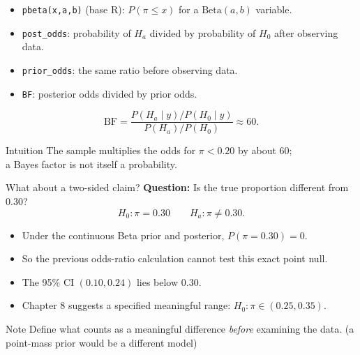 \documentclass[aspectratio=43]{beamer}
\begin{document}
\begin{frame}{}
\begin{itemize}
\item \texttt{pbeta(x,a,b)} (base R): $P(\pi\le x)$ for a $\mathrm{Beta}(a,b)$ variable.
\item \texttt{post\_odds}: probability of $H_a$ divided by probability of $H_0$ after observing data.
\item \texttt{prior\_odds}: the same ratio before observing data.
\item \texttt{BF}: posterior odds divided by prior odds.
\end{itemize}
\[
\mathrm{BF}=\frac{P(H_a\mid y)/P(H_0\mid y)}
{P(H_a)/P(H_0)}\approx60.
\]
\begin{block}{Intuition}
The sample multiplies the odds for $\pi<0.20$ by about 60;\\a Bayes factor is not itself a probability.
\end{block}
\end{frame}

\begin{frame}{What about a two-sided claim?}
\textbf{Question:} Is the true proportion different from $0.30$?
\[
H_0:\pi=0.30\qquad H_a:\pi\ne0.30.
\]

\begin{itemize}
\item Under the continuous Beta prior and posterior, $P(\pi=0.30)=0$.
\item So the previous odds-ratio calculation cannot test this exact point null.
\item The 95\% CI $(0.10,0.24)$ lies below $0.30$.
\item Chapter 8 suggests a specified meaningful range: $H_0:\pi\in(0.25,0.35)$.
\end{itemize}
\begin{block}{Note}
Define what counts as a meaningful difference \emph{before} examining the data.
(a point-mass prior would be a different model)
\end{block}
\end{frame}
\end{document}
